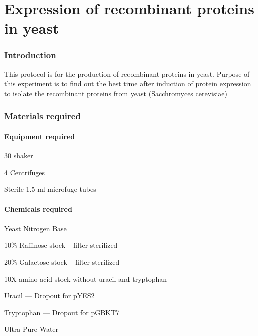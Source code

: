 \part{Expression of recombinant proteins in yeast}
\newpage
\setlength{\parindent}{0pt}
\setcounter{secnumdepth}{5}
\setcounter{section}{0}
\renewcommand*{\theHsection}{exy.\the\value{section}}
\section{Introduction}
This protocol is for the production of recombinant proteins in yeast. Purpose of this experiment is to find out the best time after induction of protein expression to isolate the recombinant proteins from yeast (Sacchromyces cerevisiae)
\section{Materials required}

		\subsection{Equipment required}
			\begin{packed_enum}
				\item 30{\textcelsius} shaker
				\item 4{\textcelsius} Centrifuges
				\item Sterile 1.5 ml microfuge tubes
			\end{packed_enum}
 
		\subsection{Chemicals required}
			\begin{packed_enum}
			\item Yeast Nitrogen Base
			\item 10\% Raffinose stock -- filter sterilized
			\item 20\% Galactose stock -- filter sterilized
			\item 10X amino acid stock without uracil and tryptophan
			\item Uracil --- Dropout for pYES2
			\item Tryptophan --- Dropout for pGBKT7
			\item Ultra Pure Water
			\end{packed_enum}
